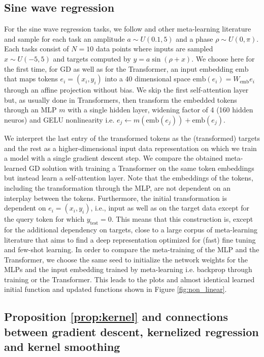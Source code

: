 \documentclass{article}
\theoremstyle{plain}
\theoremstyle{definition}
\theoremstyle{remark}
\begin{document}
\subsection{Sine wave regression}
\label{app:non_linear}

For the sine wave regression tasks, we follow \cite{finn_model-agnostic_2017} and other meta-learning literature and sample for each task an amplitude $a \sim U(0.1, 5)$ and a phase $\rho \sim U(0, \pi)$. Each tasks consist of $N=10$ data points where inputs are sampled $x \sim U(-5, 5)$ and targets computed by $y = a \sin(\rho + x)$.
We choose here for the first time, for GD as well as for the Transformer, an input embedding $\text{emb}$ that maps tokens $e_i = (x_i, y_i)$ into a $40$ dimensional space $\text{emb}(e_i) =  W_{\text{emb}}e_i$ through an affine projection without bias. We skip the first self-attention layer but, as usually done in Transformers, then transform the embedded tokens through an MLP $m$ with a single hidden layer, widening factor of 4 (160 hidden neuros) and GELU nonlinearity \citep{gelu} i.e. $e_j \leftarrow m(\text{emb}(e_j)) + \text{emb}(e_j)$. 

We interpret the last entry of the transformed tokens as the (transformed) targets and the rest as a higher-dimensional input data representation on which we train a model with a single gradient descent step. We compare the obtained meta-learned GD solution with training a Transformer on the same token embeddings but instead learn a self-attention layer. Note that the embeddings of the tokens, including the transformation through the MLP, are not dependent on an interplay between the tokens. Furthermore, the initial transformation is dependent on $e_i = (x_i, y_i)$, i.e., input as well as on the target data except for the query token for which $y_{\text{test}}=0$. This means that this construction is, except for the additional dependency on targets, close to a large corpus of meta-learning literature that aims to find a deep representation optimized for (fast) fine tuning and few-shot learning.
In order to compare the meta-training of the MLP and the Transformer, we choose the same seed to initialize the network weights for the MLPs and the input embedding trained by meta-learning i.e. backprop through training or the Transformer. This leads to the plots and almost identical learned initial function and updated functions shown in Figure \ref{fig:non_linear}.

\subsection{Proposition \ref{prop:kernel} and connections between gradient descent, kernelized regression and kernel smoothing}
\label{app:ker_reg}
\end{document}
